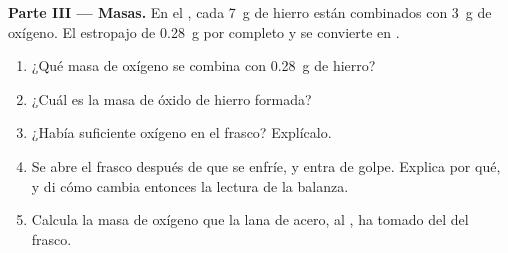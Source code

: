\begin{problem}
\medskip
\noindent\textbf{Parte III --- Masas.}
En el , cada \qty{7}{g} de hierro están combinados con
\qty{3}{g} de oxígeno. El estropajo de \qty{0.28}{g}  por completo y
se convierte en .
\begin{enumerate}[resume]
  \item ¿Qué masa de oxígeno se combina con \qty{0.28}{g} de hierro?
  \item ¿Cuál es la masa de óxido de hierro formada?
  \item ¿Había suficiente oxígeno en el frasco? Explícalo.
  \item Se abre el frasco después de que se enfríe, y entra  de
        golpe. Explica por qué, y di cómo cambia entonces la lectura de
        la balanza.
  \item Calcula la masa de oxígeno que la lana de acero, al , ha
        tomado del  del frasco.
\end{enumerate}
\end{problem}
